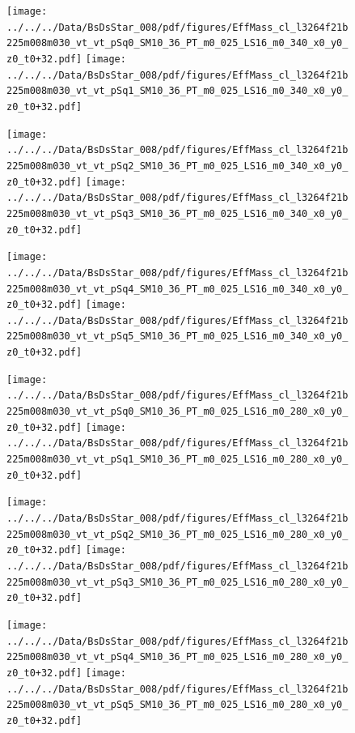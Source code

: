\documentclass[a4paper,10pt]{article}
\begin{document}
\begin{figure}[p]
 \texttt{[image: ../../../Data/BsDsStar\_008/pdf/figures/EffMass\_cl\_l3264f21b225m008m030\_vt\_vt\_pSq0\_SM10\_36\_PT\_m0\_025\_LS16\_m0\_340\_x0\_y0\_z0\_t0+32.pdf]} 
 \texttt{[image: ../../../Data/BsDsStar\_008/pdf/figures/EffMass\_cl\_l3264f21b225m008m030\_vt\_vt\_pSq1\_SM10\_36\_PT\_m0\_025\_LS16\_m0\_340\_x0\_y0\_z0\_t0+32.pdf]} 
 \end{figure}
\begin{figure}[p]
 \texttt{[image: ../../../Data/BsDsStar\_008/pdf/figures/EffMass\_cl\_l3264f21b225m008m030\_vt\_vt\_pSq2\_SM10\_36\_PT\_m0\_025\_LS16\_m0\_340\_x0\_y0\_z0\_t0+32.pdf]} 
 \texttt{[image: ../../../Data/BsDsStar\_008/pdf/figures/EffMass\_cl\_l3264f21b225m008m030\_vt\_vt\_pSq3\_SM10\_36\_PT\_m0\_025\_LS16\_m0\_340\_x0\_y0\_z0\_t0+32.pdf]} 
 \end{figure}
\begin{figure}[p]
 \texttt{[image: ../../../Data/BsDsStar\_008/pdf/figures/EffMass\_cl\_l3264f21b225m008m030\_vt\_vt\_pSq4\_SM10\_36\_PT\_m0\_025\_LS16\_m0\_340\_x0\_y0\_z0\_t0+32.pdf]} 
 \texttt{[image: ../../../Data/BsDsStar\_008/pdf/figures/EffMass\_cl\_l3264f21b225m008m030\_vt\_vt\_pSq5\_SM10\_36\_PT\_m0\_025\_LS16\_m0\_340\_x0\_y0\_z0\_t0+32.pdf]} 
 \end{figure}
\clearpage
\begin{figure}[p]
 \texttt{[image: ../../../Data/BsDsStar\_008/pdf/figures/EffMass\_cl\_l3264f21b225m008m030\_vt\_vt\_pSq0\_SM10\_36\_PT\_m0\_025\_LS16\_m0\_280\_x0\_y0\_z0\_t0+32.pdf]} 
 \texttt{[image: ../../../Data/BsDsStar\_008/pdf/figures/EffMass\_cl\_l3264f21b225m008m030\_vt\_vt\_pSq1\_SM10\_36\_PT\_m0\_025\_LS16\_m0\_280\_x0\_y0\_z0\_t0+32.pdf]} 
 \end{figure}
\begin{figure}[p]
 \texttt{[image: ../../../Data/BsDsStar\_008/pdf/figures/EffMass\_cl\_l3264f21b225m008m030\_vt\_vt\_pSq2\_SM10\_36\_PT\_m0\_025\_LS16\_m0\_280\_x0\_y0\_z0\_t0+32.pdf]} 
 \texttt{[image: ../../../Data/BsDsStar\_008/pdf/figures/EffMass\_cl\_l3264f21b225m008m030\_vt\_vt\_pSq3\_SM10\_36\_PT\_m0\_025\_LS16\_m0\_280\_x0\_y0\_z0\_t0+32.pdf]} 
 \end{figure}
\begin{figure}[p]
 \texttt{[image: ../../../Data/BsDsStar\_008/pdf/figures/EffMass\_cl\_l3264f21b225m008m030\_vt\_vt\_pSq4\_SM10\_36\_PT\_m0\_025\_LS16\_m0\_280\_x0\_y0\_z0\_t0+32.pdf]} 
 \texttt{[image: ../../../Data/BsDsStar\_008/pdf/figures/EffMass\_cl\_l3264f21b225m008m030\_vt\_vt\_pSq5\_SM10\_36\_PT\_m0\_025\_LS16\_m0\_280\_x0\_y0\_z0\_t0+32.pdf]} 
 \end{figure}
\clearpage
\clearpage
\end{document}
